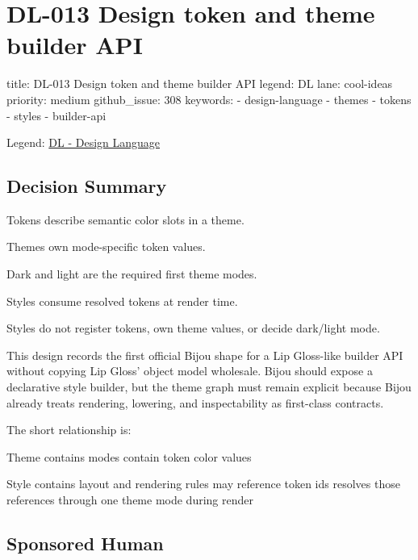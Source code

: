 \chapter{DL-013 Design token and theme builder API}\label{record-178}

\smallskip

\begin{RecordMeta}
title: DL-013 Design token and theme builder API
legend: DL
lane: cool-ideas
priority: medium
github_issue: 308
keywords:
  - design-language
  - themes
  - tokens
  - styles
  - builder-api

\end{RecordMeta}

Legend: \href{https://github.com/flyingrobots/bijou/blob/1853ad902f6bf219326409e7f743a5a1d6517dbc/docs/legends/DL-design-language.md}{DL - Design Language}

\section{Decision Summary}\label{record-178-decision-summary}

Tokens describe semantic color slots in a theme.

Themes own mode-specific token values.

Dark and light are the required first theme modes.

Styles consume resolved tokens at render time.

Styles do not register tokens, own theme values, or decide dark/light mode.

This design records the first official Bijou shape for a Lip Gloss-like builder API without copying Lip Gloss' object model wholesale. Bijou should expose a declarative style builder, but the theme graph must remain explicit because Bijou already treats rendering, lowering, and inspectability as first-class contracts.

The short relationship is:

\begin{CodeBlock}
Theme
  contains modes
    contain token color values

Style
  contains layout and rendering rules
  may reference token ids
  resolves those references through one theme mode during render
\end{CodeBlock}

\section{Sponsored Human}\label{record-178-sponsored-human}

